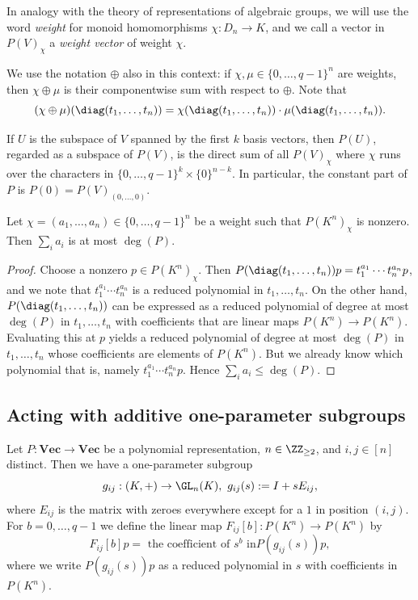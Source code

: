 \documentclass{amsart}
\renewcommand{\Vec}{\mathbf{Vec}}
\begin{document}
In analogy with the theory of representations of algebraic groups, we will
use the word {\em weight} for monoid homomorphisms $\chi:D_n \to K$, and
we call a vector in $P(V)_\chi$ a {\em weight vector} of weight $\chi$.

We use the notation $\oplus$ also in this context: if
$\chi,\mu \in \{0,\ldots,q-1\}^n$ are weights, then $\chi \oplus
\mu$ is their componentwise sum with respect to $\oplus$. Note that
\[ (\chi \oplus
\mu)(\diag(t_1,\ldots,t_n))=\chi(\diag(t_1,\ldots,t_n)) \cdot
\mu(\diag(t_1,\ldots,t_n)).\]

\begin{ex}
If $U$ is the subspace of $V$ spanned by the first $k$ basis vectors,
then $P(U)$, regarded as a subspace of $P(V)$, is the direct sum of all
$P(V)_\chi$ where $\chi$ runs over the characters in $\{0,\dots,q-1\}^k
\times \{0\}^{n-k}$. In particular, the constant part of $P$ is
$P(0)=P(V)_{(0,\ldots,0)}$.
\end{ex}

\begin{lm} \label{lm:BoundSupport}
Let $\chi=(a_1,\ldots,a_n) \in \{0,\ldots,q-1\}^n$ be a weight such that
$P(K^n)_\chi$ is nonzero. Then $\sum_i a_i$ is at most
$\deg(P)$. 
\end{lm}

\begin{proof}
Choose a nonzero $p \in P(K^n)_\chi$. Then
$P(\diag(t_1,\ldots,t_n))p=t_1^{a_1} \cdots t_n^{a_n} p$, and we
note that $t_1^{a_1} \cdots t_n^{a_n}$ is a reduced polynomial in
$t_1,\ldots,t_n$. On the other hand, $P(\diag(t_1,\ldots,t_n))$ can
be expressed as a reduced polynomial of degree at most $\deg(P)$ in
$t_1,\ldots,t_n$ with coefficients that are linear maps $P(K^n) \to
P(K^n)$. Evaluating this at $p$ yields a reduced polynomial of degree
at most $\deg(P)$ in $t_1,\ldots,t_n$ whose coefficients are elements of
$P(K^n)$. But we already know which polynomial that is, namely $t_1^{a_1} \cdots t_n^{a_n}
p$. Hence $\sum_i a_i \leq \deg(P)$.
\end{proof}

\subsection{Acting with additive one-parameter subgroups}
\label{ssec:Additive}

Let $P:\Vec \to \Vec$ be a polynomial representation, $n \in \ZZ_{\geq 2}$,
and $i,j \in [n]$ distinct. Then we have a one-parameter subgroup
\[ g_{ij}:(K,+) \to \GL_n(K),\  g_{ij}(s):=I+s E_{ij}, \]
where $E_{ij}$ is the matrix with zeroes everywhere except for a $1$
in position $(i,j)$. For $b=0,\ldots,q-1$ we define the linear map
$F_{ij}[b]:P(K^n) \to P(K^n)$ by
\[ F_{ij}[b]p=\text{ the coefficient of $s^b$ in
}P(g_{ij}(s))p, 
\]
where we write $P(g_{ij}(s))p$ as a reduced polynomial in $s$ with
coefficients in $P(K^n)$.
\end{document}
